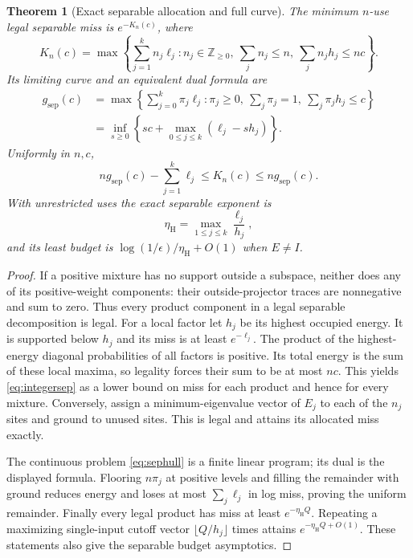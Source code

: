 \documentclass[11pt,a4paper]{article}
\newtheorem{theorem}{Theorem}[section]
\theoremstyle{remark}
\newcommand{\etah}{\eta_{\mathrm H}}
\newcommand{\gs}{g_{\mathrm{sep}}}
\begin{document}
\begin{theorem}[Exact separable allocation and full curve]\label{thm:sep}
The minimum \(n\)-use legal separable miss is \(e^{-K_n(c)}\), where
\begin{equation}\label{eq:integersep}
 K_n(c)=\max\left\{\sum_{j=1}^k n_j\ell_j:
 n_j\in\mathbb Z_{\geq0},\
 \sum_jn_j\leq n,\
 \sum_jn_jh_j\leq nc\right\}.
\end{equation}
Its limiting curve and an equivalent dual formula are
\begin{align}
 \gs(c)&=\max\left\{\sum_{j=0}^k\pi_j\ell_j:
 \pi_j\geq0,\ \sum_j\pi_j=1,\ \sum_j\pi_jh_j\leq c\right\}\label{eq:sephull}\\
 &=\inf_{s\geq0}\left\{sc+\max_{0\leq j\leq k}(\ell_j-sh_j)\right\}.
 \nonumber
\end{align}
Uniformly in \(n,c\),
\[
 n\gs(c)-\sum_{j=1}^k\ell_j\leq K_n(c)\leq n\gs(c).
\]
With unrestricted uses the exact separable exponent is
\begin{equation}\label{eq:eta}
 \etah=\max_{1\leq j\leq k}\frac{\ell_j}{h_j},
\end{equation}
and its least budget is \(\log(1/\epsilon)/\etah+O(1)\) when \(E\ne I\).
\end{theorem}
\begin{proof}
If a positive mixture has no support outside a subspace, neither does
any of its positive-weight components: their outside-projector traces
are nonnegative and sum to zero. Thus every product component in a legal
separable decomposition is legal. For a local factor let \(h_j\) be its
highest occupied energy. It is supported below \(h_j\) and its miss is at
least \(e^{-\ell_j}\). The product of the highest-energy diagonal
probabilities of all factors is positive. Its total energy is the sum
of these local maxima, so legality forces their sum to be at most \(nc\).
This yields \eqref{eq:integersep} as a lower bound on miss for each product
and hence for every mixture. Conversely, assign a minimum-eigenvalue
vector of \(E_j\) to each of the \(n_j\) sites and ground to unused sites.
This is legal and attains its allocated miss exactly.

The continuous problem \eqref{eq:sephull} is a finite linear program;
its dual is the displayed formula. Flooring \(n\pi_j\) at positive
levels and filling the remainder with ground reduces energy and loses
at most \(\sum_j\ell_j\) in log miss, proving the uniform remainder.
Finally every legal product has miss at least \(e^{-\etah Q}\).
Repeating a maximizing single-input cutoff vector \(\lfloor Q/h_j\rfloor\)
times attains \(e^{-\etah Q+O(1)}\). These statements also give the
separable budget asymptotics.
\end{proof}
\end{document}
